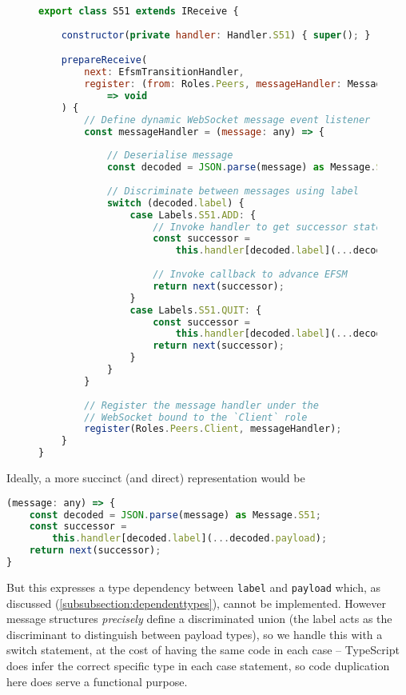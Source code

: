 \begin{figure}[!h]
\begin{lstlisting}[language=javascript,tabsize=2]
export class S51 extends IReceive {
	
	constructor(private handler: Handler.S51) { super(); }

	prepareReceive(
		next: EfsmTransitionHandler,
		register: (from: Roles.Peers, messageHandler: MessageHandler)
			=> void
	) {
		// Define dynamic WebSocket message event listener
		const messageHandler = (message: any) => {
		
			// Deserialise message
			const decoded = JSON.parse(message) as Message.S51;
			
			// Discriminate between messages using label
			switch (decoded.label) {
				case Labels.S51.ADD: {
					// Invoke handler to get successor state
					const successor = 
						this.handler[decoded.label](...decoded.payload);
						
					// Invoke callback to advance EFSM
					return next(successor);
				}
				case Labels.S51.QUIT: {
					const successor = 
						this.handler[decoded.label](...decoded.payload);
					return next(successor);	
				}
			}            
		}
		
		// Register the message handler under the
		// WebSocket bound to the `Client` role
		register(Roles.Peers.Client, messageHandler);
	}
}
\end{lstlisting}
\label{lst:nodereceive}
\end{figure}

Ideally, a more succinct (and direct) representation would be
\begin{lstlisting}[language=javascript]
(message: any) => {
	const decoded = JSON.parse(message) as Message.S51;
	const successor = 
		this.handler[decoded.label](...decoded.payload);
	return next(successor);
}
\end{lstlisting}

But this expresses a type dependency between \texttt{label}
and \texttt{payload} which, as discussed 
(\cref{subsubsection:dependenttypes}), cannot be implemented.
However message structures \textit{precisely} 
define a discriminated union 
(the label acts as the discriminant 
to distinguish between payload types),
so we handle this with a switch statement,
at the cost of having the same code in each case --
TypeScript does infer the correct specific type in each case statement,
so code duplication here does serve a functional purpose.


